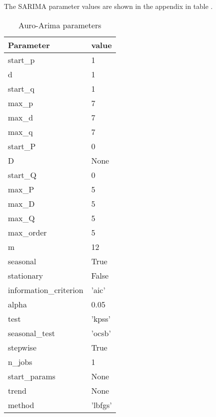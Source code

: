 The SARIMA parameter values are shown in the appendix in table .
\begin{table}[h]
  \centering
  \caption{Auro-Arima parameters}
  \label{table:auto-arima-parameters}
  \begin{tabular}{|l|l|}\hline
    Parameter              & value   \\ \hline
    \hline
    start\_p               & 1       \\ \hline
    d                      & 1       \\ \hline
    start\_q               & 1       \\ \hline
    max\_p                 & 7       \\ \hline
    max\_d                 & 7       \\ \hline
    max\_q                 & 7       \\ \hline
    start\_P               & 0       \\ \hline
    D                      & None    \\ \hline
    start\_Q               & 0       \\ \hline
    max\_P                 & 5       \\ \hline
    max\_D                 & 5       \\ \hline
    max\_Q                 & 5       \\ \hline
    max\_order             & 5       \\ \hline
    m                      & 12      \\ \hline
    seasonal               & True    \\ \hline
    stationary             & False   \\ \hline
    information\_criterion & 'aic'   \\ \hline
    alpha                  & 0.05    \\ \hline
    test                   & 'kpss'  \\ \hline
    seasonal\_test         & 'ocsb'  \\ \hline
    stepwise               & True    \\ \hline
    n\_jobs                & 1       \\ \hline
    start\_params          & None    \\ \hline
    trend                  & None    \\ \hline
    method                 & 'lbfgs' \\ \hline

\end{tabular}
\end{table}
